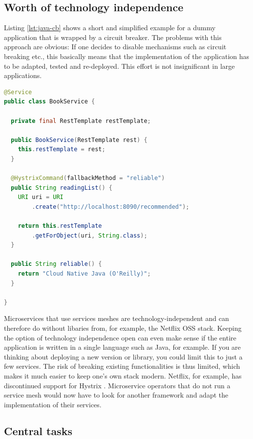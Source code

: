 \subsection{Worth of technology independence}

Listing \ref{lst:java-cb} shows a short and simplified example for a dummy application that is wrapped by a circuit breaker. The problems with this approach are obvious: If one decides to disable mechanisms such as circuit breaking etc., this basically means that the implementation of the application has to be adapted, tested and re-deployed. This effort is not insignificant in large applications. 

\begin{lstlisting}[basicstyle=\footnotesize ,language=java,caption={Circuit breaker example with Spring Cloud + Hystrix \cite{hystrix-ex}}, label={lst:java-cb}]
@Service
public class BookService {

  private final RestTemplate restTemplate;

  public BookService(RestTemplate rest) {
    this.restTemplate = rest;
  }

  @HystrixCommand(fallbackMethod = "reliable")
  public String readingList() {
    URI uri = URI
        .create("http://localhost:8090/recommended");

    return this.restTemplate
        .getForObject(uri, String.class);
  }

  public String reliable() {
    return "Cloud Native Java (O'Reilly)";
  }

}
\end{lstlisting}

Microservices that use services meshes are technology-independent and can therefore do without libaries from, for example, the Netflix OSS stack. Keeping the option of technology independence open can even make sense if the entire application is written in a single language such as Java, for example. If you are thinking about deploying a new version or library, you could limit this to just a few services. The risk of breaking existing functionalities is thus limited, which makes it much easier to keep one's own stack modern. Netflix, for example, has discontinued support for Hystrix \cite{hystrix-eol}. Microservice operators that do not run a service mesh would now have to look for another framework and adapt the implementation of their services.

\subsection{Central tasks}

